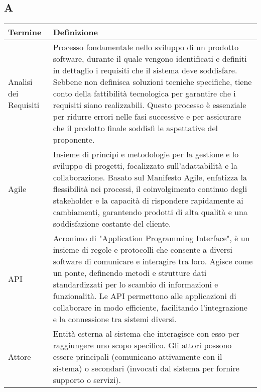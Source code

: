 \documentclass[10pt]{article}
\begin{document}
\subsection{A} %
\begin{longtable}{|>{\centering\arraybackslash}m{2.5cm}|>{\arraybackslash}m{12.5cm}|}
\hline
\rowcolor[gray]{0.8}
\textbf{Termine} & \textbf{Definizione}\\
\endhead
\hline
Analisi dei Requisiti & Processo fondamentale nello sviluppo di un prodotto software, durante il quale vengono identificati e definiti in dettaglio i requisiti che il sistema deve soddisfare. Sebbene non definisca soluzioni tecniche specifiche, tiene conto della fattibilità tecnologica per garantire che i requisiti siano realizzabili. Questo processo è essenziale per ridurre errori nelle fasi successive e per assicurare che il prodotto finale soddisfi le aspettative del proponente.\\
\hline
Agile & Insieme di principi e metodologie per la gestione e lo sviluppo di progetti, focalizzato sull'adattabilità e la collaborazione. Basato sul Manifesto Agile, enfatizza la flessibilità nei processi, il coinvolgimento continuo degli stakeholder e la capacità di rispondere rapidamente ai cambiamenti, garantendo prodotti di alta qualità e una soddisfazione costante del cliente.\\
\hline
API & Acronimo di "Application Programming Interface", è un insieme di regole e protocolli che consente a diversi software di comunicare e interagire tra loro. Agisce come un ponte, definendo metodi e strutture dati standardizzati per lo scambio di informazioni e funzionalità. Le API permettono alle applicazioni di collaborare in modo efficiente, facilitando l'integrazione e la connessione tra sistemi diversi.\\
\hline
Attore & Entità esterna al sistema che interagisce con esso per raggiungere uno scopo specifico. Gli attori possono essere principali (comunicano attivamente con il sistema) o secondari (invocati dal sistema per fornire supporto o servizi).\\
\hline
\end{longtable}
\end{document}
